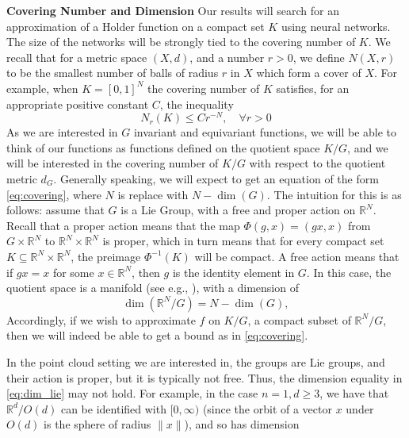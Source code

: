 \documentclass[twoside,11pt]{article}
\newcommand{\sh}[1]{\textcolor{orange}{\textbf{Snir: } #1}}
\newcommand{\RR}{\mathbb{R}}
\begin{document}
\textbf{Covering Number and Dimension}
Our results will search for an approximation of a Holder function on a compact set $K$ using neural networks. The size of the networks will be  strongly tied to the covering number of $K$. We recall that for a metric space $(X,d)$, and a number $r>0$, we define $N(X,r)$ to be the smallest number of balls of radius $r$ in $X$ which form a cover of $X$.  For example, when $K=[0,1]^N$ the covering number of $K$ satisfies, for an appropriate positive constant $C$, the inequality  
\begin{equation}\label{eq:covering}
N_r(K)\leq Cr^{-N}, \quad \forall r>0 
\end{equation}
As we are interested in $G$ invariant and equivariant functions, we will be able to think of our functions as functions defined on the quotient space $K/G $, and we will be interested in the covering number of $K/G$ with respect to the quotient metric $d_G$. Generally speaking, we will expect to get an equation of the form \eqref{eq:covering}, where $N $ is replace with $N-\dim(G) $. The intuition for this is as follows: assume that  $G$ is a Lie Group, with a free and proper action on $\RR^N$. Recall that a proper action means that the map $\Phi(g,x)=(gx,x) $ from $G\times \RR^N$ to $\RR^N\times \RR^N $ is proper, which in turn means that for every compact set $K\subseteq \RR^N\times \RR^N$, the preimage $\Phi^{-1}(K) $ will be compact. A free action means that if $gx=x$ for some $x\in \RR^N$, then $g$ is the identity element in $G$. 
In this case,  the quotient space is a manifold (see e.g., \cite{duistermaat2012lie}), with a dimension of 
\begin{equation}\label{eq:dim_lie}
\dim(\RR^N/G)=N-\dim(G),
\end{equation}
Accordingly, if we wish to approximate $f$ on $K/G$, a compact subset of $\RR^N/G $, then  we will indeed be able to get a bound as in \eqref{eq:covering}. 



In the point cloud setting we are interested in, the groups are Lie groups, and their action is proper, but it is typically not free. Thus, the dimension equality in \eqref{eq:dim_lie} may not hold. For  example, in the case $n=1,d\geq 3$, we have that $\RR^d/O(d) $ can be identified with $[0,\infty)$ (since the orbit of a vector $x$ under $O(d)$ is the sphere of radius $\|x\|$), and so has dimension
 
\end{document}

